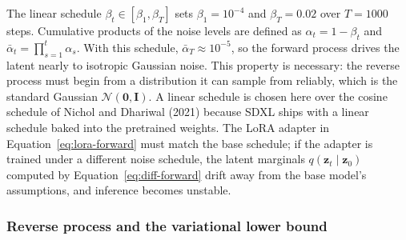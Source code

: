 \documentclass{article}
\begin{document}
The linear schedule $\beta_t \in [\beta_1, \beta_T]$ sets $\beta_1 = 10^{-4}$ and $\beta_T = 0.02$ over $T = 1000$ steps. Cumulative products of the noise levels are defined as $\alpha_t = 1 - \beta_t$ and $\bar\alpha_t = \prod_{s=1}^{t} \alpha_s$. With this schedule, $\bar\alpha_T \approx 10^{-5}$, so the forward process drives the latent nearly to isotropic Gaussian noise. This property is necessary: the reverse process must begin from a distribution it can sample from reliably, which is the standard Gaussian $\mathcal{N}(\mathbf{0}, \mathbf{I})$. A linear schedule is chosen here over the cosine schedule of Nichol and Dhariwal (2021) because SDXL ships with a linear schedule baked into the pretrained weights. The LoRA adapter in Equation~\ref{eq:lora-forward} must match the base schedule; if the adapter is trained under a different noise schedule, the latent marginals $q(\mathbf{z}_t \mid \mathbf{z}_0)$ computed by Equation~\ref{eq:diff-forward} drift away from the base model's assumptions, and inference becomes unstable.

\subsubsection*{Reverse process and the variational lower bound}
\end{document}
